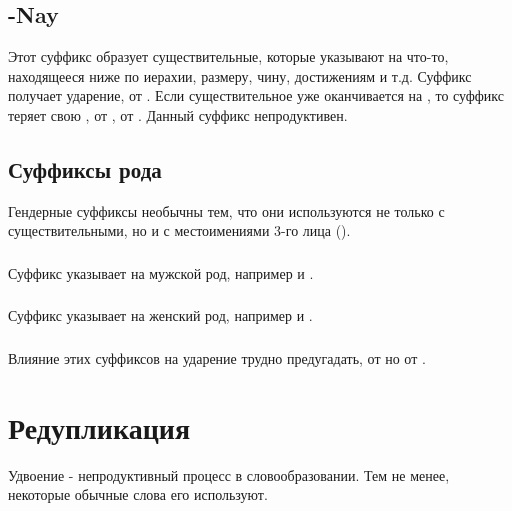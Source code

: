 \subsection{-Nay} Этот суффикс образует существительные, которые указывают на что-то, находящееся ниже по иерахии, размеру, чину, достижениям и т.д.
Суффикс получает ударение,   от  .  Если существительное уже оканчивается на
, то суффикс теряет свою , 
 от  , 
 от  .  Данный суффикс непродуктивен.


\subsection{Суффиксы рода} Гендерные суффиксы необычны тем, что они используются не только с существительными, но и с местоимениями 3-го лица
().  \label{lingop:suffix:gender}

\subsubsection{} Суффикс  указывает на мужской род, например
  и  .

\subsubsection{} Суффикс  указывает на женский род, например
  и  .

\subsubsection{} Влияние этих суффиксов на ударение трудно предугадать,   от 
 но   от
 .


\section{Редупликация}
\noindent Удвоение - непродуктивный процесс в словообразовании.
Тем не менее, некоторые обычные слова его используют. 

